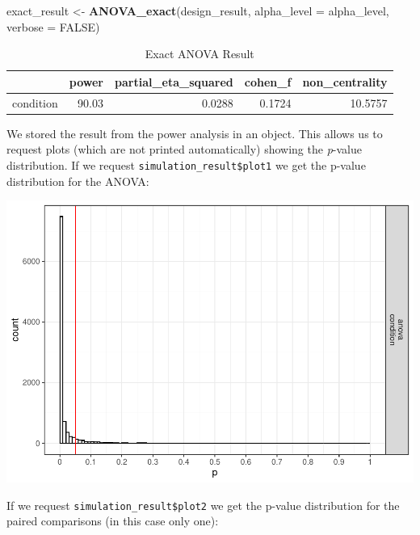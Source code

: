 \documentclass[]{book}
\newenvironment{Shaded}{\begin{snugshade}}{\end{snugshade}}
\newcommand{\DataTypeTok}[1]{\textcolor[rgb]{0.13,0.29,0.53}{#1}}
\newcommand{\KeywordTok}[1]{\textcolor[rgb]{0.13,0.29,0.53}{\textbf{#1}}}
\newcommand{\NormalTok}[1]{#1}
\newcommand{\OtherTok}[1]{\textcolor[rgb]{0.56,0.35,0.01}{#1}}
\newcommand{\StringTok}[1]{\textcolor[rgb]{0.31,0.60,0.02}{#1}}
\begin{document}
\begin{Shaded}
\begin{Highlighting}[]
\NormalTok{exact_result <-}\StringTok{ }\KeywordTok{ANOVA_exact}\NormalTok{(design_result,}
                            \DataTypeTok{alpha_level =}\NormalTok{ alpha_level,}
                            \DataTypeTok{verbose =} \OtherTok{FALSE}\NormalTok{)}
\end{Highlighting}
\end{Shaded}

\begin{table}[t]

\caption{\label{tab:unnamed-chunk-23}Exact ANOVA Result}
\centering
\begin{tabular}{l|r|r|r|r}
\hline
  & power & partial\_eta\_squared & cohen\_f & non\_centrality\\
\hline
condition & 90.03 & 0.0288 & 0.1724 & 10.5757\\
\hline
\end{tabular}
\end{table}

We stored the result from the power analysis in an object. This allows us to request plots (which are not printed automatically) showing the \emph{p}-value distribution. If we request \texttt{simulation\_result\$plot1} we get the p-value distribution for the ANOVA:

\includegraphics{SuperpowerValidation_files/figure-latex/unnamed-chunk-24-1.pdf}

If we request \texttt{simulation\_result\$plot2} we get the p-value distribution for the paired comparisons (in this case only one):
\end{document}
